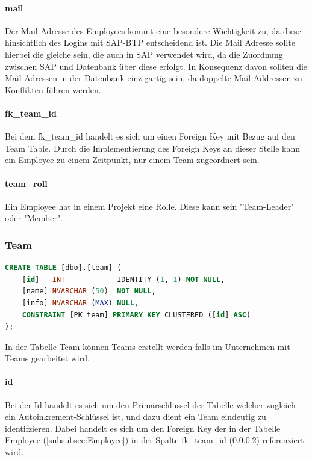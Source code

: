 \documentclass{article}
\begin{document}
\paragraph{mail} Der Mail-Adresse des Employees kommt eine besondere Wichtigkeit zu, da diese
hinsichtlich des Logins mit SAP-BTP entscheidend ist. Die Mail Adresse sollte
hierbei die gleiche sein, die auch in SAP verwendet wird, da die Zuordnung
zwischen SAP und Datenbank über diese erfolgt. In Konsequenz davon sollten die
Mail Adressen in der Datenbank einzigartig sein, da doppelte Mail Addressen zu
Konflikten führen werden.

\paragraph{fk\_team\_id}
\label{paragraph:fkTeamId} Bei dem fk\_team\_id handelt es sich um einen Foreign Key mit Bezug auf den Team Table. Durch die Implementierung des Foreign Keys an
dieser Stelle kann ein Employee zu einem Zeitpunkt, nur einem Team zugeordnert sein.

\paragraph{team\_roll}Ein Employee hat in einem Projekt eine Rolle. Diese kann sein "Team-Leader"
oder "Member".

\subsubsection{Team}
\begin{lstlisting}[language=Sql, caption= Create Table Statement für Team Table]
    CREATE TABLE [dbo].[team] (
    [id]   INT            IDENTITY (1, 1) NOT NULL,
    [name] NVARCHAR (50)  NOT NULL,
    [info] NVARCHAR (MAX) NULL,
    CONSTRAINT [PK_team] PRIMARY KEY CLUSTERED ([id] ASC)
);

         \end{lstlisting}

In der Tabelle Team können Teams erstellt werden falls im Unternehmen mit Teams
gearbeitet wird.
\paragraph{id} Bei der Id handelt es sich um den Primärschlüssel der Tabelle welcher zugleich
ein Autoinkrement-Schlüssel ist, und dazu dient ein Team eindeutig zu
identifzieren. Dabei handelt es sich um den Foreign Key der in der Tabelle
Employee (\ref{subsubsec:Employee}) in der Spalte fk\_team\_id
(\ref{paragraph:fkTeamId}) referenziert wird.
\end{document}
